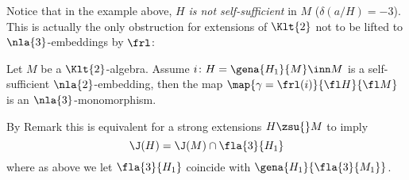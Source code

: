 Notice that in the example above, $H$ {\em is not self-sufficient} in $M$ ($\delta(a/H)=-3$). This is actually
the only obstruction for extensions of $\Klt{2}$ not to be lifted to $\nla{3}$-embeddings by $\frl$:
\begin{prop}\label{bellemma}
Let $M$ be a $\Klt{2}$-algebra. Assume $i\colon H=\gena{H_{1}}{M}\inn M$ is a self-sufficient $\nla{2}$-embedding,
then the map $\map{\gamma=\frl(i)}{\fl H}{\fl M}$ is an $\nla{3}$-monomorphism.

By Remark  this is equivalent for a strong extensions $H\zsu{}M$ to imply \[\J(H)=\J(M)\cap\fla{3}{H_{1}}\]
where as above we let $\fla{3}{H_{1}}$ coincide with $\gena{H_{1}}{\fla{3}{M_{1}}}$.
\end{prop}
